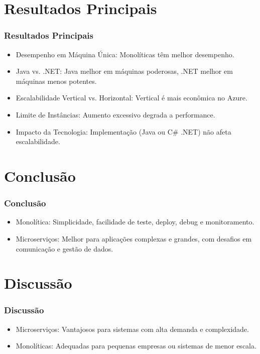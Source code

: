\documentclass{beamer}
\begin{document}
\section{Resultados Principais}

\begin{frame}
\frametitle{Resultados Principais}
\begin{itemize}
    \item Desempenho em Máquina Única: Monolíticas têm melhor desempenho.
    \item Java vs. .NET: Java melhor em máquinas poderosas, .NET melhor em máquinas menos potentes.
    \item Escalabilidade Vertical vs. Horizontal: Vertical é mais econômica no Azure.
    \item Limite de Instâncias: Aumento excessivo degrada a performance.
    \item Impacto da Tecnologia: Implementação (Java ou C\# .NET) não afeta escalabilidade.
\end{itemize}
\end{frame}

\section{Conclusão}

\begin{frame}
\frametitle{Conclusão}
\begin{itemize}
    \item Monolítica: Simplicidade, facilidade de teste, deploy, debug e monitoramento.
    \item Microserviços: Melhor para aplicações complexas e grandes, com desafios em comunicação e gestão de dados.
\end{itemize}
\end{frame}

\section{Discussão}

\begin{frame}
\frametitle{Discussão}
\begin{itemize}
    \item Microserviços: Vantajosos para sistemas com alta demanda e complexidade.
    \item Monolíticas: Adequadas para pequenas empresas ou sistemas de menor escala.
\end{itemize}
\end{frame}
\end{document}
